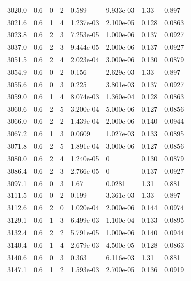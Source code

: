 \documentclass[preview]{standalone}
\begin{document}
{{{{{{{{{{{{\begin{tabular}{L{1.2cm}C{1.2cm} C{0.3cm}C{0.5cm} C{1.4cm}C{1.4cm} C{1.4cm}C{1.4cm}}
  3020.0  &   0.6  & 0     &  2 &  0.589  & 9.933e-03  & 1.33 &  0.897   \\ 
  3021.6  &   0.6  & 1     &  4 &  1.237e-03  & 2.100e-05  & 0.128 &  0.0863   \\ 
  3023.8  &   0.6  & 2     &  3 &  7.253e-05  & 1.000e-06  & 0.137 &  0.0927   \\ 
  3037.0  &   0.6  & 2     &  3 &  9.444e-05  & 2.000e-06  & 0.137 &  0.0927   \\ 
  3051.5  &   0.6  & 2     &  4 &  2.023e-04  & 3.000e-06  & 0.130 &  0.0879   \\ 
  3054.9  &   0.6  & 0     &  2 &  0.156  & 2.629e-03  & 1.33 &  0.897   \\ 
  3055.6  &   0.6  & 0     &  3 &  0.225  & 3.801e-03  & 0.137 &  0.0927   \\ 
  3059.0  &   0.6  & 1     &  4 &  8.074e-03  & 1.360e-04  & 0.128 &  0.0863   \\ 
  3060.6  &   0.6  & 2     &  5 &  3.200e-04  & 5.000e-06  & 0.127 &  0.0856   \\ 
  3066.0  &   0.6  & 2     &  2 &  1.439e-04  & 2.000e-06  & 0.140 &  0.0944   \\ 
  3067.2  &   0.6  & 1     &  3 &  0.0609  & 1.027e-03  & 0.133 &  0.0895   \\ 
  3071.8  &   0.6  & 2     &  5 &  1.891e-04  & 3.000e-06  & 0.127 &  0.0856   \\ 
  3080.0  &   0.6  & 2     &  4 &  1.240e-05  & 0  & 0.130 &  0.0879   \\ 
  3086.4  &   0.6  & 2     &  3 &  2.766e-05  & 0  & 0.137 &  0.0927   \\ 
  3097.1  &   0.6  & 0     &  3 &  1.67  & 0.0281  & 1.31 &  0.881   \\ 
  3111.5  &   0.6  & 0     &  2 &  0.199  & 3.361e-03  & 1.33 &  0.897   \\ 
  3112.6  &   0.6  & 2     &  0 &  1.020e-04  & 2.000e-06  & 0.144 &  0.0974   \\ 
  3129.1  &   0.6  & 1     &  3 &  6.499e-03  & 1.100e-04  & 0.133 &  0.0895   \\ 
  3132.4  &   0.6  & 2     &  2 &  5.791e-05  & 1.000e-06  & 0.140 &  0.0944   \\ 
  3140.4  &   0.6  & 1     &  4 &  2.679e-03  & 4.500e-05  & 0.128 &  0.0863   \\ 
  3140.6  &   0.6  & 0     &  3 &  0.363  & 6.116e-03  & 1.31 &  0.881   \\ 
  3147.1  &   0.6  & 1     &  2 &  1.593e-03  & 2.700e-05  & 0.136 &  0.0919   \\ 

\end{tabular}}}}}}}}}}}}}
\end{document}
